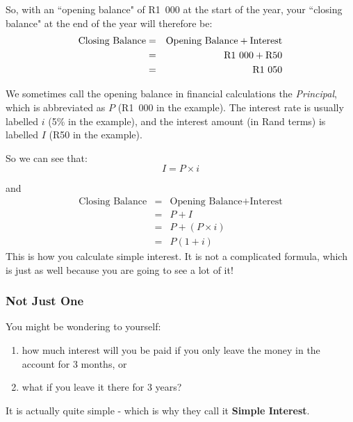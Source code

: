 \documentclass[10pt,a4paper,titlepage,twoside,openright]{report}
\begin{document}
So, with an ``opening balance" of R1~000 at the start of the year, your ``closing balance" at the end of the year will therefore be:
\begin{eqnarray*}
\mbox{Closing Balance} &=& \mbox{Opening Balance} + \mbox{Interest}\\
&=& \rm{R}1~000 + \rm{R}50\\
&=& \rm{R}1~050
\end{eqnarray*}

We sometimes call the opening balance in financial calculations the \textit{Principal}, which is abbreviated as $P$ (R1~000 in the example). The interest rate is usually labelled $i$ (5\% in the example), and the interest amount (in Rand terms) is labelled $I$ (R50 in the example).

So we can see that:
\begin{equation}
I = P \times i
\end{equation}

and
\begin{eqnarray*}
\mbox{Closing Balance} &=& \mbox{Opening Balance} + \mbox{Interest}\\
&=& P + I\\
&=& P + (P \times i)\\
&=& P(1+i)
\end{eqnarray*}
This is how you calculate simple interest. It is not a complicated formula, which is just as well because you are going to see a lot of it! 

\subsubsection{Not Just One}
You might be wondering to yourself:

\begin{enumerate}[topsep=0ex, partopsep=\parskip,itemsep=\parskip]
\item{how much interest will you be paid if you only leave the money in the account for 3 months, or}
\item{what if you leave it there for 3 years?}
\end{enumerate}
\vspace{0.5cm}
It is actually quite simple - which is why they call it \textbf{Simple Interest}.\\
\end{document}

